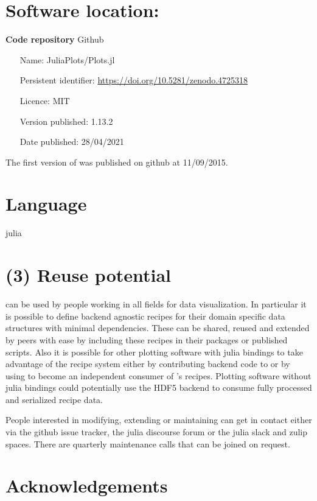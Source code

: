 \documentclass[a4paper]{article}
\begin{document}
\section*{Software location:}

{\bf Code repository} Github

\begin{itemize}[noitemsep,topsep=0pt]
	\item[Name:] JuliaPlots/Plots.jl
	\item[Persistent identifier:] \url{https://doi.org/10.5281/zenodo.4725318}
	\item[Licence:] MIT
        	\item[Version published:] 1.13.2
	\item[Date published:] 28/04/2021
\end{itemize}

The first version of \Plots was published on github at 11/09/2015.

\section*{Language}

julia

\section*{(3) Reuse potential}


\Plots can be used by people working in all fields for data visualization.
In particular it is possible to define backend agnostic recipes for their domain specific data structures with minimal dependencies.
These can be shared, reused and extended by peers with ease by including these recipes in their packages or published scripts.
Also it is possible for other plotting software with julia bindings to take advantage of the recipe system either by contributing backend code to \Plots or by using  to become an independent consumer of 's recipes.
Plotting software without julia bindings could potentially use the HDF5 backend to consume fully processed and serialized recipe data.

People interested in modifying, extending or maintaining \Plots can get in contact either via the github issue tracker, the julia discourse forum or the julia slack and zulip spaces.
There are quarterly maintenance calls that can be joined on request.

\section*{Acknowledgements}
\end{document}
